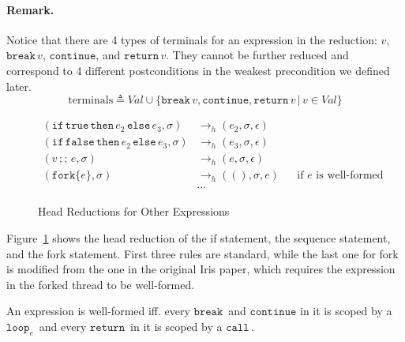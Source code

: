\documentclass{article}
\numberwithin{algorithm}{section}
\newcommand{\true}{\texttt{true}}
\newcommand{\false}{\texttt{false}}
\newcommand{\cfork}[1]{\texttt{fork}\{#1\}}
\newcommand{\cloop}[1]{\texttt{loop}_{#1}\,}
\newcommand{\cbreak}{\texttt{break}\,}
\newcommand{\ccontinue}{\texttt{continue}}
\newcommand{\cif}{\texttt{if}\,}
\newcommand{\cthen}{\,\texttt{then}\,}
\newcommand{\celse}{\,\texttt{else}\,}
\newcommand{\cseq}{\,;;\,}
\newcommand{\creturn}{\texttt{return}\,}
\newcommand{\ccall}{\texttt{call}\,}
\newcommand{\hred}{\rightarrow_h}
\newcommand{\sep}{\,|\,}
\begin{document}
\paragraph{Remark.} Notice that there are 4 types of terminals for an expression in the reduction: $v$, $\cbreak v$, $\ccontinue$, and $\creturn v$.
They cannot be further reduced and correspond to 4 different postconditions in the weakest precondition we defined later.
$$
\text{terminals} \triangleq \textit{Val} \cup \{\cbreak v, \ccontinue, \creturn v \sep v \in \textit{Val}\}
$$

\begin{figure}[h]
$$
\begin{aligned}
    (\cif \true \cthen e_2 \celse e_3, \sigma) &\hred (e_2, \sigma, \epsilon) && \\
    (\cif \false \cthen e_2 \celse e_3, \sigma) &\hred (e_3, \sigma, \epsilon) && \\
    (v \cseq e, \sigma) &\hred (e, \sigma, \epsilon) && \\
    (\cfork{e}, \sigma) &\hred ((), \sigma, e) && \text{if $e$ is well-formed} \\
    &\cdots
\end{aligned}
$$
\caption{Head Reductions for Other Expressions}
\label{fig:hred-other}
\end{figure}

Figure~\ref{fig:hred-other} shows the head reduction of the if statement, the sequence statement, and the fork statement.
First three rules are standard, while the last one for fork is modified from the one in the original Iris paper, which requires the expression in the forked thread to be well-formed.
\begin{definition}
    An expression is well-formed iff. every $\cbreak\!$ and $\ccontinue$ in it is scoped by a $\cloop{e}\!$ and every $\creturn\!$ in it is scoped by a $\ccall\!$.    
\end{definition}
\end{document}
